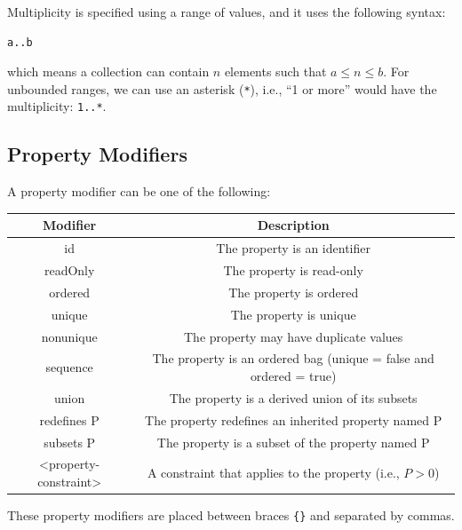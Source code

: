 \documentclass{article}
\begin{document}
Multiplicity is specified using a range of values, and it uses the following syntax:
\begin{lstlisting}[numbers=none]
a..b
\end{lstlisting}
which means a collection can contain \(n\) elements such that \(a \leq n \leq b\).
For unbounded ranges, we can use an asterisk (\lstinline{*}), i.e.,
``1 or more'' would have the multiplicity: \lstinline{1..*}.
\subsection{Property Modifiers}
A property modifier can be one of the following:
\begin{table}[H]
    \centering
    \begin{tabular}{c c}
        \toprule
        \textbf{Modifier}     & \textbf{Description}                                               \\
        \midrule
        id                    & The property is an identifier                                      \\
        readOnly              & The property is read-only                                          \\
        ordered               & The property is ordered                                            \\
        unique                & The property is unique                                             \\
        nonunique             & The property may have duplicate values                             \\
        sequence              & The property is an ordered bag (unique = false and ordered = true) \\
        union                 & The property is a derived union of its subsets                     \\
        redefines P           & The property redefines an inherited property named P               \\
        subsets P             & The property is a subset of the property named P                   \\
        <property-constraint> & A constraint that applies to the property (i.e., \(P>0\))          \\
        \bottomrule
    \end{tabular}
\end{table}
These property modifiers are placed between braces \lstinline!{}! and separated by commas.
\end{document}
